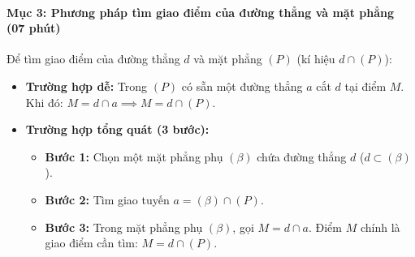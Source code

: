 \documentclass[12pt, a4paper]{article}
\begin{document}
\paragraph{Mục 3: Phương pháp tìm giao điểm của đường thẳng và mặt phẳng (07 phút)}
Để tìm giao điểm của đường thẳng $d$ và mặt phẳng $(P)$ (kí hiệu $d \cap (P)$):
\begin{itemize}
    \item \textbf{Trường hợp dễ:} Trong $(P)$ có sẵn một đường thẳng $a$ cắt $d$ tại điểm $M$. Khi đó: $M = d \cap a \implies M = d \cap (P)$.
    \item \textbf{Trường hợp tổng quát (3 bước):}
    \begin{itemize}
        \item \textbf{Bước 1:} Chọn một mặt phẳng phụ $(\beta)$ chứa đường thẳng $d$ ($d \subset (\beta)$).
        \item \textbf{Bước 2:} Tìm giao tuyến $a = (\beta) \cap (P)$.
        \item \textbf{Bước 3:} Trong mặt phẳng phụ $(\beta)$, gọi $M = d \cap a$. Điểm $M$ chính là giao điểm cần tìm: $M = d \cap (P)$.
    \end{itemize}
\end{itemize}
\end{document}

